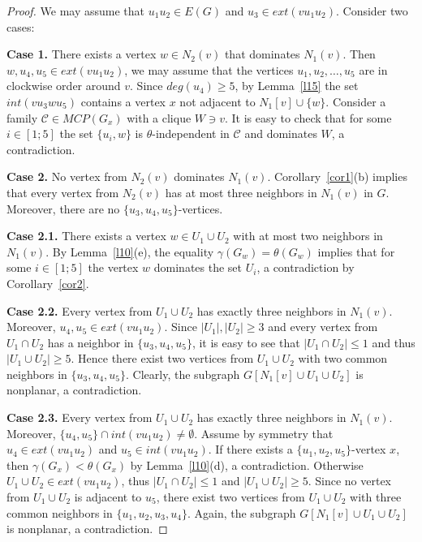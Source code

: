 \documentclass[12pt]{article}
\begin{document}
\begin{proof}
We may assume that $u_1u_2 \in E(G)$ and $u_3 \in ext(vu_1u_2)$. Consider two cases:

\textbf{Case 1.} There exists a vertex $w \in N_2(v)$ that dominates $N_1(v)$. Then $w,u_4,u_5 \in ext(vu_1u_2)$, we may assume that the vertices $u_1,u_2,\ldots,u_5$ are in clockwise order around $v$. Since $deg(u_4) \geq 5$, by Lemma~\ref{l15} the set $int(vu_3wu_5)$ contains a vertex $x$ not adjacent to $N_1[v] \cup \{w\}$. Consider a family $\mathcal{C} \in MCP(G_x)$ with a clique $W \ni v$. It is easy to check that for some $i \in [1;5]$ the set $\{u_i,w\}$ is $\theta$-independent in $\mathcal{C}$ and dominates $W$, a contradiction.

\textbf{Case 2.} No vertex from $N_2(v)$ dominates $N_1(v)$. Corollary~\ref{cor1}(b) implies that every vertex from $N_2(v)$ has at most three neighbors in $N_1(v)$ in $G$. Moreover, there are no $\{u_3,u_4,u_5\}$-vertices.

\textbf{Case 2.1.} There exists a vertex $w \in U_1 \cup U_2$ with at most two neighbors in $N_1(v)$. By Lemma~\ref{l10}(e), the equality $\gamma(G_w) = \theta(G_w)$ implies that for some $i \in [1;5]$ the vertex $w$ dominates the set $U_i$, a contradiction by Corollary~\ref{cor2}.

\textbf{Case 2.2.} Every vertex from $U_1 \cup U_2$ has exactly three neighbors in $N_1(v)$. Moreover, $u_4,u_5 \in ext(vu_1u_2)$. Since $|U_1|,|U_2| \geq 3$ and every vertex from $U_1 \cap U_2$ has a neighbor in $\{u_3,u_4,u_5\}$, it is easy to see that $|U_1 \cap U_2| \leq 1$ and thus $|U_1 \cup U_2| \geq 5$. Hence there exist two vertices from $U_1 \cup U_2$ with two common neighbors in $\{u_3,u_4,u_5\}$. Clearly, the subgraph $G[N_1[v] \cup U_1 \cup U_2]$ is nonplanar, a contradiction.

\textbf{Case 2.3.} Every vertex from $U_1 \cup U_2$ has exactly three  neighbors in $N_1(v)$. Moreover, $\{u_4,u_5\} \cap int(vu_1u_2) \neq \emptyset$. Assume by symmetry that $u_4 \in ext(vu_1u_2)$ and $u_5 \in int(vu_1u_2)$. If there exists a $\{u_1,u_2,u_5\}$-vertex $x$, then $\gamma(G_x) < \theta(G_x)$ by Lemma~\ref{l10}(d), a contradiction. Otherwise $U_1 \cup U_2 \in ext(vu_1u_2)$, thus $|U_1 \cap U_2| \leq 1$ and $|U_1 \cup U_2| \geq 5$. Since no vertex from $U_1 \cup U_2$ is adjacent to $u_5$, there exist two vertices from $U_1 \cup U_2$ with three common neighbors in $\{u_1,u_2,u_3,u_4\}$. Again, the subgraph $G[N_1[v] \cup U_1 \cup U_2]$ is nonplanar, a contradiction.
\end{proof}
\end{document}
